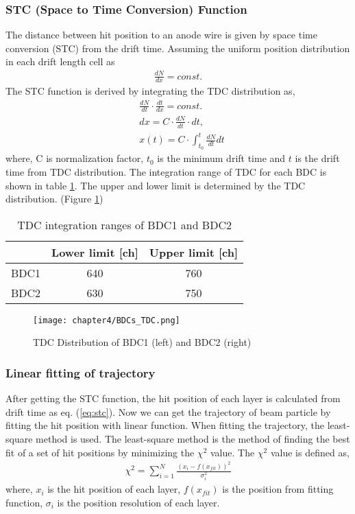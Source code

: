 \subsubsection{STC (Space to Time Conversion) Function}
The distance between hit position to an anode wire is given by space time conversion (STC) from the drift time. Assuming the uniform position distribution in each drift length cell as
\begin{align}
    \frac{dN}{dx} = const.  
\end{align}
The STC function is derived by integrating the TDC distribution as,
\begin{align}
    &\frac{dN}{dt} \cdot \frac{dt}{dx} = const.\\
    &dx = C \cdot \frac{dN}{dt} \cdot dt,\\
    &x(t) = C \cdot \int_{t_{0}}^{t} \frac{dN}{dt} dt \label{eq:stc}
\end{align}
where, C is normalization factor, $t_0$ is the minimum drift time and $t$ is the drift time from TDC distribution. 
The integration range of TDC for each BDC is shown in table \ref{tab:TDC_BDCs}. The upper and lower limit is determined by the TDC distribution. (Figure \ref{fig:TDC_BDCs}) 
\begin{table}[h]
    \centering
    \begin{tabular}{c|cc}
        \hline
        &Lower limit [ch]& Upper limit [ch]\\
        \hline
        BDC1&640&760\\
        BDC2&630&750\\        
        \hline
    \end{tabular}
    \caption[TDC integration ranges of BDCs]{TDC integration ranges of BDC1 and BDC2}
    \label{tab:TDC_BDCs}
\end{table}

\begin{figure}[h]
    \centering
    \texttt{[image: chapter4/BDCs\_TDC.png]}
    \caption[TDC Distribution of BDCs]{TDC Distribution of BDC1 (left) and BDC2 (right)}
    \label{fig:TDC_BDCs}
\end{figure}

\subsubsection{Linear fitting of trajectory}
After getting the STC function, the hit position of each layer is calculated from drift time as eq. (\ref{eq:stc}). Now we can get the trajectory of beam particle by fitting the hit position with linear function. When fitting the trajectory, the least-square method is used. The least-square method is the method of finding the best fit of a set of hit positions by minimizing the $\chi^2$ value. The $\chi^2$ value is defined as,
\begin{align}
    \chi^2 = \sum_{i=1}^{N} \frac{(x_{i} - f(x_{fit}))^2}{\sigma_{i}^2}
\end{align}
where, $x_{i}$ is the hit position of each layer, $f(x_{fit})$ is the position from fitting function, $\sigma_{i}$ is the position resolution of each layer.

